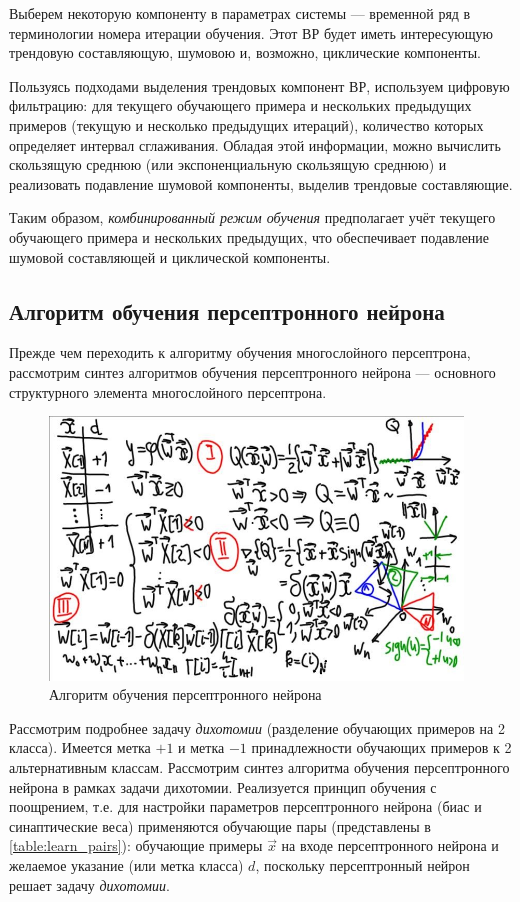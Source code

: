 \documentclass[a4paper]{article}
\numberwithin{equation}{subsection}
\begin{document}
Выберем некоторую компоненту в параметрах системы --- временной ряд в терминологии
номера итерации обучения. Этот ВР будет иметь интересующую трендовую составляющую,
шумовою и, возможно, циклические компоненты.

Пользуясь подходами выделения трендовых компонент ВР, используем цифровую фильтрацию:
для текущего обучающего примера и нескольких предыдущих примеров (текущую и несколько
предыдущих итераций), количество которых определяет интервал сглаживания.
Обладая этой информации, можно вычислить скользящую среднюю (или экспоненциальную 
скользящую среднюю) и реализовать подавление шумовой компоненты, выделив 
трендовые составляющие.

Таким образом, \textit{комбинированный режим обучения} предполагает учёт текущего
обучающего примера и нескольких предыдущих, что обеспечивает подавление шумовой 
составляющей и циклической компоненты.




\subsection{Алгоритм обучения персептронного нейрона}

Прежде чем переходить к алгоритму обучения многослойного персептрона, рассмотрим
синтез алгоритмов обучения персептронного нейрона --- основного структурного
элемента многослойного персептрона.

\begin{figure}[htbp]
    \centering
    \includegraphics[height=7cm]{hyperflat_6_1.jpeg}
    \caption{Алгоритм обучения персептронного нейрона}
    \label{hyperflat_6_1}
\end{figure}

Рассмотрим подробнее задачу \textit{дихотомии} (разделение обучающих примеров 
на 2 класса). Имеется метка $+1$ и метка $-1$ принадлежности обучающих примеров 
к 2 альтернативным классам. Рассмотрим синтез алгоритма обучения персептронного 
нейрона в рамках задачи дихотомии. Реализуется принцип обучения с поощрением, т.е.
для настройки параметров персептронного нейрона (биас и синаптические веса) 
применяются обучающие пары (представлены в \ref{table:learn_pairs}): обучающие примеры
$\vec{x}$ на входе персептронного нейрона и желаемое указание (или метка класса) $d$,
поскольку персептронный нейрон решает задачу \textit{дихотомии}.
\end{document}
